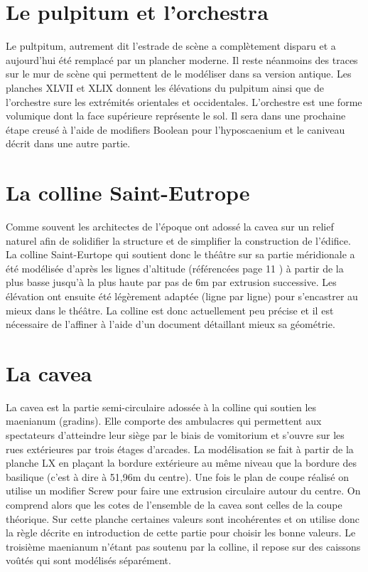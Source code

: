 		\section{Le pulpitum et l'orchestra} 

Le pultpitum, autrement dit l'estrade de scène a complètement disparu et a aujourd'hui été remplacé par un plancher moderne. Il reste néanmoins des traces sur le mur de scène qui permettent de le modéliser dans sa version antique. Les planches XLVII et XLIX \cite{ref2} donnent les élévations du pulpitum ainsi que de l'orchestre sure les extrémités orientales et occidentales. L'orchestre est une forme volumique dont la face supérieure représente le sol. Il sera dans une prochaine étape creusé à l'aide de modifiers Boolean pour l'hyposcaenium et le caniveau décrit dans une autre partie.

		\section{La colline Saint-Eutrope} 
Comme souvent les architectes de l'époque ont adossé la cavea sur un relief naturel afin de solidifier la structure et de simplifier la construction de l'édifice. La colline Saint-Eurtope qui soutient donc le théâtre sur sa partie méridionale a été modélisée d'après les lignes d'altitude (référencées page 11 \cite{ref}) à partir de la plus basse jusqu'à la plus haute par pas de 6m par extrusion successive. Les élévation ont ensuite été légèrement adaptée (ligne par ligne) pour s'encastrer au mieux dans le théâtre. La colline est donc actuellement peu précise et il est nécessaire de l'affiner à l'aide d'un document détaillant mieux sa géométrie.

		\section{La cavea} 

La cavea est la partie semi-circulaire adossée à la colline qui soutien les maenianum (gradins). Elle comporte des ambulacres qui permettent aux spectateurs d'atteindre leur siège par le biais de vomitorium et s'ouvre sur les rues extérieures par trois étages d'arcades. La modélisation se fait à partir de la planche LX \cite{ref2} en plaçant la bordure extérieure au même niveau que la bordure des basilique (c'est à dire à 51,96m du centre). Une fois le plan de coupe réalisé on utilise un modifier Screw pour faire une extrusion circulaire autour du centre. On comprend alors que les cotes de l'ensemble de la cavea sont celles de la coupe théorique. Sur cette planche certaines valeurs sont incohérentes et on utilise donc la règle décrite en introduction de cette partie pour choisir les bonne valeurs.
Le troisième maenianum n'étant pas soutenu par la colline, il repose sur des caissons voûtés qui sont modélisés séparément. 

